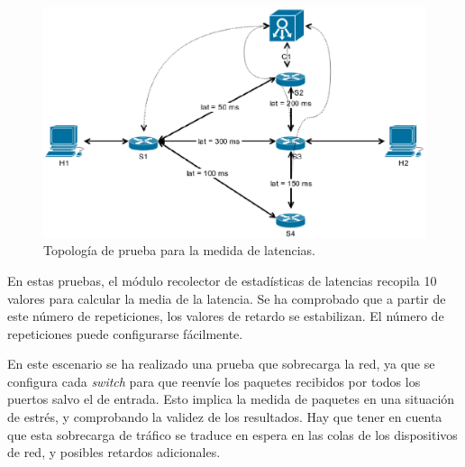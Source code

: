 \documentclass[a4paper,11pt]{book}
\begin{document}
\begin{figure}
\centering
\includegraphics[scale=0.6]{./figuras/topologyLatency}
\caption{Topología de prueba para la medida de latencias.}\label{topologyLatency}
\end{figure}

En estas pruebas, el módulo recolector de estadísticas de latencias recopila 10 valores para calcular la media de la latencia. Se ha  comprobado que a partir de este número de repeticiones, los valores de retardo se estabilizan. El número de repeticiones puede configurarse fácilmente. 

En este escenario se ha realizado una prueba que sobrecarga la red, ya que se configura cada \textit{switch} para que reenvíe los paquetes recibidos por todos los puertos salvo el de entrada. Esto implica la medida de paquetes en una situación de estrés, y comprobando la validez de los resultados. Hay que tener en cuenta que esta sobrecarga de tráfico se traduce en espera en las colas de los dispositivos de red, y posibles retardos adicionales. 
\end{document}
